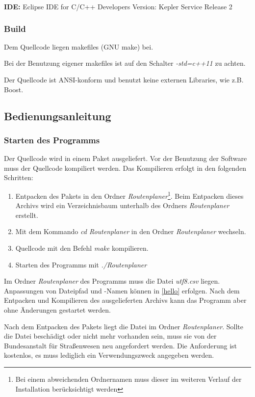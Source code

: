 \documentclass[12pt, a4paper, ngerman]{article}
\begin{document}
\textbf{IDE:}\newline
Eclipse IDE for C/C++ Developers \newline
Version: Kepler Service Release 2

\subsubsection{Build}
Dem Quellcode liegen makefiles (GNU make) bei.

Bei der Benutzung eigener makefiles ist auf den Schalter \textit{-std=c++11} zu achten. 

Der Quellcode ist ANSI-konform und benutzt keine externen Libraries, wie z.B. Boost.

\subsection{Bedienungsanleitung \label{Bedienungsanleitung}}
\subsubsection{Starten des Programms}
Der Quellcode wird in einem Paket ausgeliefert. Vor der Benutzung der Software muss der Quellcode kompiliert werden. Das Kompilieren erfolgt in den folgenden Schritten:
\begin{enumerate}
	\item Entpacken des Pakets in den Ordner \textit{Routenplaner}\footnote{Bei einem abweichenden Ordnernamen muss dieser im weiteren Verlauf der Installation berücksichtigt werden}. Beim Entpacken dieses Archivs wird ein Verzeichnisbaum unterhalb des Ordners \textit{Routenplaner} erstellt.
	\item Mit dem Kommando \textit{cd Routenplaner} in den Ordner \textit{Routenplaner} wechseln.
	\item Quellcode mit den Befehl \textit{make} kompilieren.
	\item Starten des Programms mit \textit{./Routenplaner}
\end{enumerate}

Im Ordner \textit{Routenplaner} des Programms muss die Datei \textit{utf8.csv} liegen. Anpassungen von Dateipfad und -Namen können in \ref{hello} erfolgen. Nach dem Entpacken und Kompilieren des ausgelieferten Archivs kann das Programm aber ohne Änderungen gestartet werden.

Nach dem Entpacken des Pakets liegt die Datei im Ordner \textit{Routenplaner}. Sollte die Datei beschädigt oder nicht mehr vorhanden sein, muss sie von der Bundesanstalt für Straßenwesen neu angefordert werden. Die Anforderung ist kostenlos, es muss lediglich ein Verwendungszweck angegeben werden.
\end{document}
